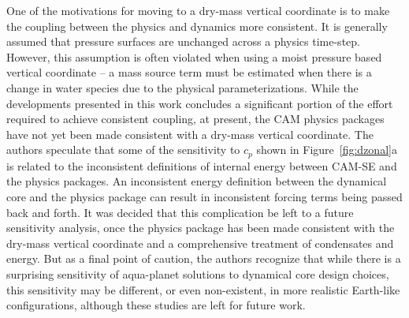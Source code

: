 \documentclass{agujournal}
\begin{document}
{One of the motivations for moving to a dry-mass vertical coordinate is to make the coupling between the physics and dynamics more consistent. It is generally assumed that pressure surfaces are unchanged across a physics time-step. However, this assumption is often violated when using a moist pressure based vertical coordinate -- a mass source term must be estimated when there is a change in water species due to the physical parameterizations. While the developments presented in this work concludes a significant portion of the effort required to achieve consistent coupling, at present, the CAM physics packages have not yet been made consistent with a dry-mass vertical coordinate. The authors speculate that some of the sensitivity to $c_p$ shown in Figure~\ref{fig:dzonal}a is related to the inconsistent definitions of internal energy between CAM-SE and the physics packages. An inconsistent energy definition between the dynamical core and the physics package can result in inconsistent forcing terms being passed back and forth. It was decided that this complication be left to a future sensitivity analysis, once the physics package has been made consistent with the dry-mass vertical coordinate and a comprehensive treatment of condensates and energy. But as a final point of caution, the authors recognize that while there is a surprising sensitivity of aqua-planet solutions to dynamical core design choices, this sensitivity may be different, or even non-existent, in more realistic Earth-like configurations, although these studies are left for future work.

}
\end{document}
